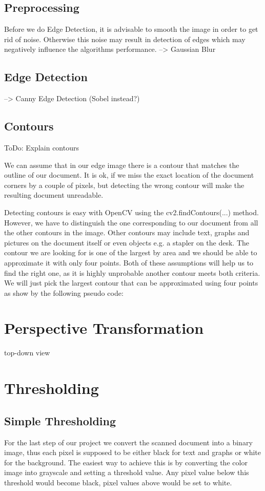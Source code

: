 \documentclass[bibliography=totoc]{scrartcl}
\begin{document}
		\subsection{Preprocessing}
		Before we do Edge Detection, it is advisable to smooth the image in order to get rid of noise. Otherwise this noise may result in detection of edges which may negatively influence the algorithms performance.
		--> Gaussian Blur
		\subsection{Edge Detection}
		--> Canny Edge Detection (Sobel instead?)
	
		\subsection{Contours}
		ToDo: Explain contours

		We can assume that in our edge image there is a contour that matches the outline of our document. 
		It is ok, if we miss the exact location of the document corners by a couple of pixels, but detecting the wrong contour will make the resulting document unreadable.

		Detecting contours is easy with OpenCV using the cv2.findContours(...) method.
		However, we have to distinguish the one corresponding to our document from all the other contours in the image.
		Other contours may include text, graphs and pictures on the document itself or even objects e.g. a stapler on the desk. 
		The contour we are looking for is one of the largest by area and we should be able to approximate it with only four points.
		Both of these assumptions will help us to find the right one, as it is highly unprobable another contour meets both criteria. 
		We will just pick the largest contour that can be approximated using four points as show by the following pseudo code:
		
	\section{Perspective Transformation}
	top-down view
	
	\section{Thresholding}
		\subsection{Simple Thresholding}
		For the last step of our project we convert the scanned document into a binary image, thus each pixel is supposed to be either black for text and graphs or white for the background.
		The easiest way to achieve this is by converting the color image into grayscale and setting a threshold value. 
		Any pixel value below this threshold would become black, pixel values above would be set to white.
\end{document}
